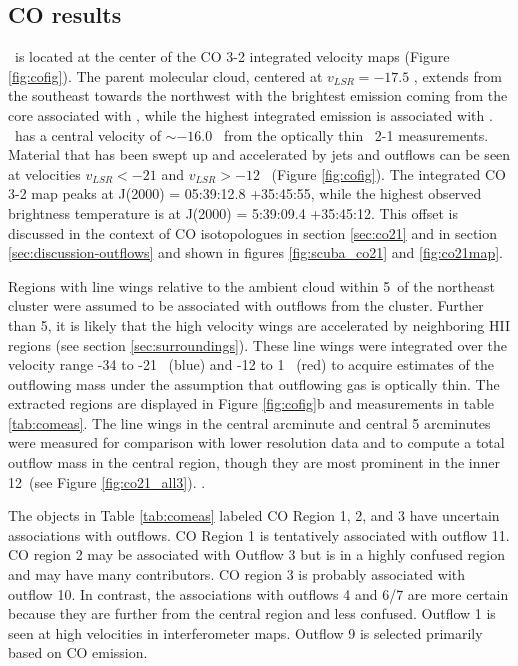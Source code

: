 \subsection{CO results}

\region\ is located at the center of the CO 3-2 integrated velocity maps
(Figure \ref{fig:cofig}).  The parent molecular cloud, centered at $v_{LSR} =
-17.5$ \kms ,  extends from the southeast towards the northwest with the
brightest emission coming from the core associated with \swcluster, while the
highest integrated emission is associated with \necluster.  \necluster\ has a central
velocity of $\sim -16.0$ \kms\ from the optically thin \ceighteeno\ 2-1 measurements.
Material that has been swept up and accelerated by jets and outflows can be
seen at velocities $v_{LSR} < -21$ \kms and $v_{LSR} > -12$ \kms\ (Figure
\ref{fig:cofig}).  The integrated CO 3-2 map peaks at J(2000) = 05:39:12.8
+35:45:55, while the highest observed brightness temperature is at J(2000) =
5:39:09.4 +35:45:12.  This offset is discussed in the context of CO isotopologues in
section \ref{sec:co21} and in section \ref{sec:discussion-outflows} and shown in
figures \ref{fig:scuba_co21} and \ref{fig:co21map}.

Regions with line wings relative to the ambient cloud within 5\arcmin\ of the
northeast cluster were assumed to be associated with outflows from the cluster.
Further than 5\arcmin, it is likely that the high velocity wings are accelerated by
neighboring HII regions (see section \ref{sec:surroundings}).  These line
wings were integrated over the velocity range -34 to -21 \kms\ (blue) and -12 to
1 \kms\ (red) to acquire estimates of the outflowing mass under the assumption
that outflowing gas is optically thin.  The extracted regions are displayed in
Figure \ref{fig:cofig}b and measurements in table \ref{tab:comeas}.  The line
wings in the central arcminute and central 5 arcminutes were measured for
comparison with lower resolution data and to compute a total outflow mass in
the central region, though they are most prominent in the inner 12\farcs\ (see
Figure \ref{fig:co21_all3}).
.  %

The objects in Table \ref{tab:comeas} labeled CO Region 1, 2, and 3 have
uncertain associations with outflows.  CO Region 1 is tentatively associated
with outflow 11. CO region 2 may be associated with Outflow 3 but is in a
highly confused region and may have many contributors.  CO region 3 is probably
associated with outflow 10.  In contrast, the associations with outflows 4 and
6/7 are more certain because they are further from the central region and less
confused.   Outflow 1 is seen at high velocities in \citet{beuther2002}
interferometer maps.  Outflow 9 is selected primarily based on CO emission.



